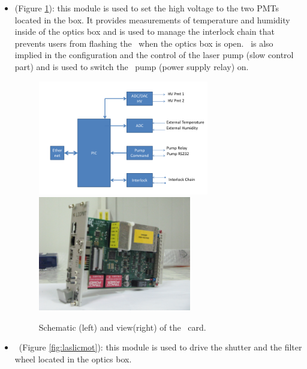 \begin{itemize}

\item \licpmt (Figure \ref{fig:laslicpmt}): this module is used to set the high voltage to the two PMTs located in the box. It provides measurements of temperature and humidity inside of the optics box and is used to manage the interlock chain that prevents users from flashing the \laser~when the optics box is open. \licpmt~is also implied in the configuration and the control of the laser pump (slow control part) and is used to switch the \laser~pump (power supply relay) on. 

\begin{figure}[htbp]
\centering
\includegraphics[height=5cm]{figures/licpmt_scheme.pdf}
\includegraphics[height=5cm]{figures/licpmt.JPG}
\caption{Schematic (left) and view(right) of the \licpmt~card.}\label{fig:laslicpmt}
\end{figure}

\item \licmot~(Figure \ref{fig:laslicmot}): this module is used to drive the shutter and the filter wheel located in the optics box. 


\end{itemize}
